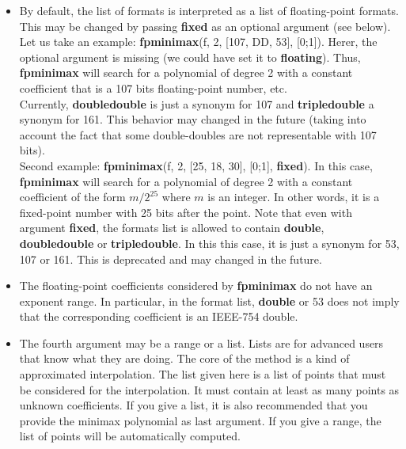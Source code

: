 \begin{itemize}
\item By default, the list of formats is interpreted as a list of floating-point
   formats. This may be changed by passing \textbf{fixed} as an optional argument (see
   below). Let us take an example: \textbf{fpminimax}(f, 2, [107, DD, 53], [0;1]).
   Herer, the optional argument is missing (we could have set it to \textbf{floating}).
   Thus, \textbf{fpminimax} will search for a polynomial of degree 2 with a constant 
   coefficient that is a 107 bits floating-point number, etc.\\
   Currently, \textbf{doubledouble} is just a synonym for 107 and \textbf{tripledouble} a 
   synonym for 161. This behavior may changed in the future (taking into
   account the fact that some double-doubles are not representable with
   107 bits).\\
   Second example: \textbf{fpminimax}(f, 2, [25, 18, 30], [0;1], \textbf{fixed}).
   In this case, \textbf{fpminimax} will search for a polynomial of degree 2 with a
   constant coefficient of the form $m/2^25$ where $m$ is an
   integer. In other words, it is a fixed-point number with 25 bits after
   the point. Note that even with argument \textbf{fixed}, the formats list is 
   allowed to contain \textbf{double}, \textbf{doubledouble} or \textbf{tripledouble}. In this this
   case, it is just a synonym for 53, 107 or 161. This is deprecated and may
   changed in the future.

\item The floating-point coefficients considered by \textbf{fpminimax} do not have an
   exponent range. In particular, in the format list, \textbf{double} or 53 does not
   imply that the corresponding coefficient is an IEEE-754 double.

\item The fourth argument may be a range or a list. Lists are for advanced users
   that know what they are doing. The core of the  method is a kind of
   approximated interpolation. The list given here is a list of points that
   must be considered for the interpolation. It must contain at least as 
   many points as unknown coefficients. If you give a list, it is also 
   recommended that you provide the minimax polynomial as last argument.
   If you give a range, the list of points will be automatically computed.


\end{itemize}

